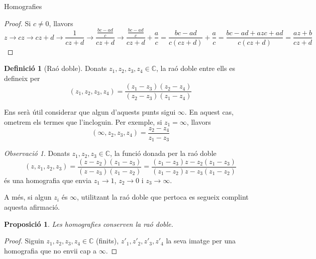 \documentclass[dvipsnames, svgnames, leqno, a4paper, 12pt]{report}
\numberwithin{equation}{chapter}
\newtheorem{proposition}[theorem]{Proposició}
\theoremstyle{definition}
\newtheorem*{definition}{Definició}
\theoremstyle{remark}
\newtheorem*{remark}{Observació}
\newcommand{\C}{\mathbb{C}}
\begin{document}
\begin{chapter}{Homografies}
\begin{proof}
            Si $c\neq0$, llavors \begin{displaymath}
                z\to cz\to cz+d\to \frac{1}{cz+d}\to \frac{\frac{bc-ad}{c}}{cz+d}\to \frac{\frac{bc-ad}{c}}{cz+d}+\frac{a}{c}=\frac{bc-ad}{c(cz+d)}+\frac{a}{c}=\frac{bc-ad+azc+ad}{c(cz+d)}=\frac{az+b}{cz+d}
            \end{displaymath}
        \end{proof}
        \begin{definition}[Raó doble]
            Donats $z_1,z_2,z_3,z_4\in\mathbb{C}$, la raó doble entre ells es defineix per \begin{displaymath}
                (z_1,z_2,z_3,z_4) = \frac{(z_1-z_3)(z_2-z_4)}{(z_2-z_3)(z_1-z_4)}
            \end{displaymath}
            
            Ens serà útil considerar que algun d'aquests punts sigui $\infty$. En aquest cas, ometrem els termes que l'incloguin. Per exemple, si $z_1 = \infty$, llavors \begin{displaymath}
                (\infty, z_2,z_3,z_4) = \frac{z_2-z_4}{z_1-z_3}
            \end{displaymath}
        \end{definition}
    \begin{remark}
        Donats $z_1,z_2,z_3\in\mathbb{C}$, la funció donada per la raó doble \begin{equation}\label{eq:rao_doble}
            (z,z_1,z_2,z_3) = \frac{(z-z_2)(z_1-z_3)}{(z-z_3)(z_1-z_2)}=\frac{(z_1-z_3)z-z_2(z_1-z_3)}{(z_1-z_2)z-z_3(z_1-z_2)}
        \end{equation}
        és una homografia que envia $z_1\to1$, $z_2\to0$ i $z_3\to\infty$.

        A més, si algun $z_i$ és $\infty$, utilitzant la raó doble que pertoca es segueix complint aquesta afirmació.
    \end{remark}
    \begin{proposition}
        Les homografies conserven la raó doble.
    \end{proposition}
    \begin{proof}
        Siguin $z_1,z_2,z_3,z_4\in \C$ (finits), $z'_1,z'_2,z'_3,z'_4$ la seva imatge per una homografia que no envii cap a $\infty$.


\end{proof}
\end{chapter}
\end{document}
